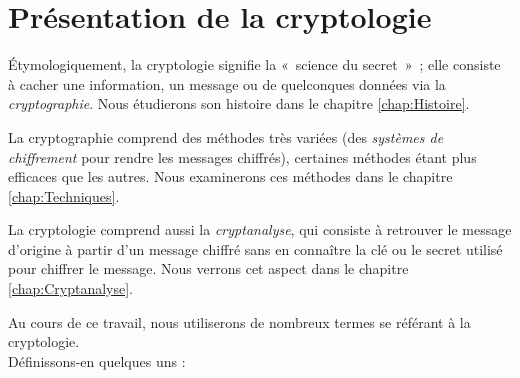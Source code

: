 \section{Présentation de la cryptologie}
Étymologiquement, la cryptologie signifie la «~science du secret~»~;
elle consiste à cacher une
information, un message ou de quelconques données via la
\emph{cryptographie}. Nous étudierons son histoire
dans le chapitre \ref{chap:Histoire}.

La cryptographie comprend des méthodes très variées (des
\emph{systèmes de chiffrement} pour rendre les messages chiffrés),
certaines méthodes étant plus efficaces que les autres.
Nous examinerons ces méthodes dans le chapitre
\ref{chap:Techniques}.

La cryptologie comprend aussi la \emph{cryptanalyse}, qui consiste à
retrouver le message d'origine à partir d'un message chiffré sans en
connaître la clé ou le secret utilisé pour chiffrer le message.
Nous verrons cet aspect dans le chapitre \ref{chap:Cryptanalyse}.

Au cours de ce travail, nous utiliserons de nombreux termes se référant à
la cryptologie. \\
Définissons-en quelques uns : 


